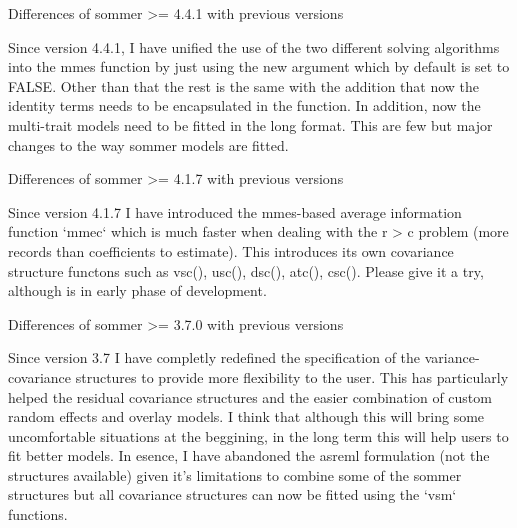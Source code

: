 \documentclass[a4paper]{book}
\begin{document}
%
\begin{Section}{Differences of sommer >= 4.4.1 with previous versions}

Since version 4.4.1, I have unified the use of the two different solving algorithms
into the mmes function by just using the new argument  which by default 
is set to FALSE. Other than that the rest is the same with the addition that now
the identity terms needs to be encapsulated in the  function. In 
addition, now the multi-trait models need to be fitted in the long format. This are 
few but major changes to the way sommer models are fitted.

\end{Section}
%
\begin{Section}{Differences of sommer >= 4.1.7 with previous versions}

Since version 4.1.7 I have introduced the mmes-based average information function `mmec` which is much faster when dealing with the r > c problem (more records than coefficients to estimate). This introduces its own covariance structure functons such as vsc(), usc(), dsc(), atc(), csc(). Please give it a try, although is in early phase of development.

\end{Section}
%
\begin{Section}{Differences of sommer >= 3.7.0 with previous versions}

Since version 3.7 I have completly redefined the specification of the variance-covariance 
structures to provide more flexibility to the user. This has particularly helped the 
residual covariance structures and the easier combination of custom random effects and 
overlay models. I think that although this will bring some uncomfortable situations at 
the beggining, in the long term this will help users to fit better models. In esence, 
I have abandoned the asreml formulation (not the structures available) given it's 
limitations to combine some of the sommer structures but all covariance structures 
can now be fitted using the `vsm` functions. 

\end{Section}
%
\end{document}
